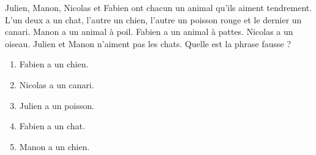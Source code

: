 Julien, Manon, Nicolas et Fabien ont chacun un animal qu'ils aiment tendrement. L'un deux a un chat, l'autre un chien, l'autre un poisson rouge et le dernier un canari. Manon a un animal à poil. Fabien a un animal à pattes. Nicolas a un oiseau. Julien et Manon n'aiment pas les chats. Quelle est la phrase fausse ?
\begin{multicols}{3}
  \begin{enumerate}[A/]
  \item Fabien a un chien.
  \item Nicolas a un canari.
  \item Julien a un poisson.
  \item Fabien a un chat.
  \item Manon a un chien.
  \end{enumerate}
\end{multicols}